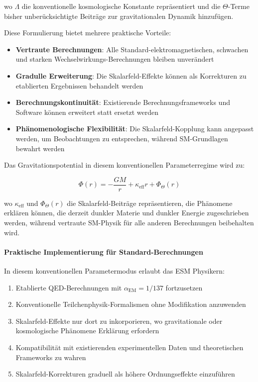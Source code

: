 \documentclass[12pt,a4paper]{article}
\newcommand{\alphaEM}{\alpha_{\text{EM}}}
\begin{document}
	wo $\Lambda$ die konventionelle kosmologische Konstante repräsentiert und die $\Theta$-Terme bisher unberücksichtigte Beiträge zur gravitationalen Dynamik hinzufügen.
	
	Diese Formulierung bietet mehrere praktische Vorteile:
	
	\begin{itemize}
		\item \textbf{Vertraute Berechnungen}: Alle Standard-elektromagnetischen, schwachen und starken Wechselwirkungs-Berechnungen bleiben unverändert
		\item \textbf{Gradulle Erweiterung}: Die Skalarfeld-Effekte können als Korrekturen zu etablierten Ergebnissen behandelt werden
		\item \textbf{Berechnungskontinuität}: Existierende Berechnungsframeworks und Software können erweitert statt ersetzt werden
		\item \textbf{Phänomenologische Flexibilität}: Die Skalarfeld-Kopplung kann angepasst werden, um Beobachtungen zu entsprechen, während SM-Grundlagen bewahrt werden
	\end{itemize}
	
	Das Gravitationspotential in diesem konventionellen Parameterregime wird zu:
	
	\begin{equation}
		\Phi(r) = -\frac{GM}{r} + \kappa_{\text{eff}} r + \Phi_{\Theta}(r)
	\end{equation}
	
	wo $\kappa_{\text{eff}}$ und $\Phi_{\Theta}(r)$ die Skalarfeld-Beiträge repräsentieren, die Phänomene erklären können, die derzeit dunkler Materie und dunkler Energie zugeschrieben werden, während vertraute SM-Physik für alle anderen Berechnungen beibehalten wird.
	
	\paragraph{Praktische Implementierung für Standard-Berechnungen}
	\label{par:practical_implementation}
	
	In diesem konventionellen Parametermodus erlaubt das ESM Physikern:
	
	\begin{enumerate}
		\item Etablierte QED-Berechnungen mit $\alphaEM = 1/137$ fortzusetzen
		\item Konventionelle Teilchenphysik-Formalismen ohne Modifikation anzuwenden
		\item Skalarfeld-Effekte nur dort zu inkorporieren, wo gravitationale oder kosmologische Phänomene Erklärung erfordern
		\item Kompatibilität mit existierenden experimentellen Daten und theoretischen Frameworks zu wahren
		\item Skalarfeld-Korrekturen graduell als höhere Ordnungseffekte einzuführen
	\end{enumerate}
	
\end{document}
